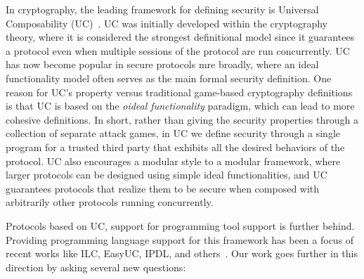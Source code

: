 In cryptography, the leading framework for defining security is Universal Composability (UC)~\cite{canettiUC}.
UC was initially developed within the cryptography theory, where it is considered the strongest definitional model since it guarantees a protocol even when multiple sessions of the protocol are run concurrently. UC has now become popular in secure protocols mre broadly, where an ideal functionality model often serves as the main formal security definition.
One reason for UC's property versus traditional game-based cryptography definitions is that UC is based on the \emph{oideal functionality} paradigm, which can lead to more cohesive definitions. In short, rather than giving the security properties through a collection of separate attack games, in UC we define security through a single program for a trusted third party that exhibits all the desired behaviors of the protocol.
UC also encourages a modular style  to a modular framework, where larger protocols can be designed using simple ideal functionalities, and UC guarantees protocols that realize them to be secure when composed with arbitrarily other protocols running concurrently.

Protocols based on UC, support for programming tool support is further behind. Providing programming language support for this framework has been a focus of recent works like ILC, EasyUC, IPDL, and others~\cite{ilc, easyuc, ipdl, sybolicuc, barbosa}. Our work goes further in this direction by asking several new questions:

